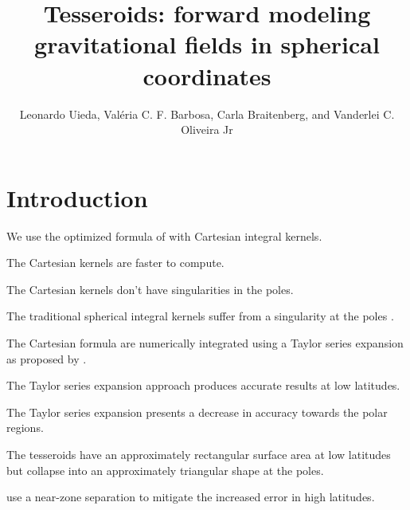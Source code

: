 \documentclass[manuscript]{geophysics}
\begin{document}
\title{
Tesseroids: forward modeling gravitational fields in spherical coordinates
}

\author{
    Leonardo Uieda\footnotemark[1]\footnotemark[2],
    Val\'eria C. F. Barbosa\footnotemark[2],
    Carla Braitenberg\footnotemark[3],
    and
    Vanderlei C. Oliveira Jr\footnotemark[2]
}

\address{
\footnotemark[1]Universidade do Estado do Rio de Janeiro,
Rio de Janeiro, Brazil.
email: leouieda@gmail.com
\\
\footnotemark[2]Observat\'orio Nacional,
Rio de Janeiro, Brazil.
\\
\footnotemark[3]Department of Mathematics and Geosciences,
University of Trieste, Trieste, Italy.
}


\maketitle

\begin{abstract}
\end{abstract}

\section{Introduction}


We use the optimized formula of \citet{Grombein2013} with Cartesian integral
kernels.

The Cartesian kernels are faster to compute.

The Cartesian kernels don't have singularities in the poles.

The traditional spherical integral kernels suffer from a singularity at the
poles \citep{Heck2007, Wild-Pfeiffer2008}.

The Cartesian formula are numerically integrated using a Taylor series
expansion as proposed by \citet{Heck2007}.

The Taylor series expansion approach produces accurate results at low
latitudes.

The Taylor series expansion presents a decrease in accuracy towards the polar
regions.

The tesseroids have an approximately rectangular surface area at low latitudes
but collapse into an approximately triangular shape at the poles.

\citet{Grombein2013} use a near-zone separation to mitigate the increased error
in high latitudes.
\end{document}
